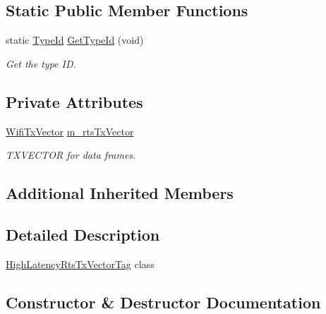\subsection*{Static Public Member Functions}
\begin{DoxyCompactItemize}
\item 
static \hyperlink{classns3_1_1TypeId}{Type\+Id} \hyperlink{classns3_1_1HighLatencyRtsTxVectorTag_ae3d950ab7c7baa95d28e133074e7efe2}{Get\+Type\+Id} (void)
\begin{DoxyCompactList}\small\item\em Get the type ID. \end{DoxyCompactList}\end{DoxyCompactItemize}
\subsection*{Private Attributes}
\begin{DoxyCompactItemize}
\item 
\hyperlink{classns3_1_1WifiTxVector}{Wifi\+Tx\+Vector} \hyperlink{classns3_1_1HighLatencyRtsTxVectorTag_a368b4acac986dd390e4f03e9f082dcf1}{m\+\_\+rts\+Tx\+Vector}
\begin{DoxyCompactList}\small\item\em T\+X\+V\+E\+C\+T\+OR for data frames. \end{DoxyCompactList}\end{DoxyCompactItemize}
\subsection*{Additional Inherited Members}


\subsection{Detailed Description}
\hyperlink{classns3_1_1HighLatencyRtsTxVectorTag}{High\+Latency\+Rts\+Tx\+Vector\+Tag} class 

\subsection{Constructor \& Destructor Documentation}
